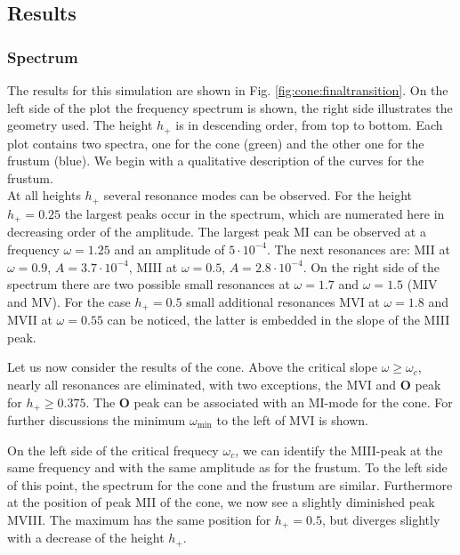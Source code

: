 \subsection{Results}%
\subsubsection{Spectrum}

The results for this simulation are shown in Fig. \ref{fig:cone:finaltransition}.
On the left side of the plot  the frequency spectrum is shown, the right side illustrates the geometry used.
The height $h_+$ is in descending order, from top to bottom.
Each plot contains two spectra, one for the cone (green)  and the other one for the frustum (blue).
We begin with a qualitative description of the curves for the frustum.\\
At all heights $h_+$ several resonance modes can be observed. For the height ${h_+=0.25}$
the largest peaks occur in the spectrum, which are numerated here in decreasing order of the amplitude.
The largest peak M\RN{1} can be observed at a frequency $\omega=1.25$ and an amplitude of $5\cdot10^{-4}$.
The next resonances are: M\RN{2} at $\omega=0.9$, $A=3.7\cdot10^{-4}$, M\RN{3} at $\omega=0.5$,  $A=2.8\cdot10^{-4}$.
On the right side of the spectrum there are two possible small resonances at $\omega=1.7$ and $\omega=1.5$ (M\RN{4} and M\RN{5}).
For the case $h_+=0.5$  small additional resonances  M\RN{6} at $\omega=1.8$ and M\RN{7} at $\omega=0.55$ can be noticed,
the latter is embedded in the slope of the M\RN{3} peak.

Let us now consider the results of the cone.
Above the critical slope $\omega\geq\omega_c$, nearly all resonances are eliminated,
with two exceptions, the M\RN{6} and \textbf{O} peak for $h_+\geq0.375$.
The \textbf{O} peak can be associated with an M\RN{1}-mode for the cone.
For further discussions the minimum $\omega_{\text{min}}$ to the left of M\RN{6} is shown.

On the left side of the critical frequecy $\omega_c$, we can identify the M\RN{3}-peak
at the same frequency and with the same amplitude as for the frustum. To the left side of this point, the spectrum for
the cone and the frustum are similar.
Furthermore at the position of peak M\RN{2} of the cone, we now see a slightly diminished peak M\RN{8}.
The maximum has the same position for $h_+=0.5$, but diverges slightly with a decrease of the height $h_+$.

